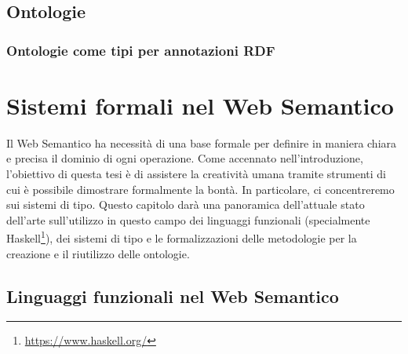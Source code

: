 \subsection{Ontologie}
\subsubsection[Ontologie come tipi per RDF]{Ontologie come tipi per annotazioni RDF}
\section{Sistemi formali nel Web Semantico}
Il Web Semantico ha necessità di una base formale per definire in maniera chiara e precisa il dominio di ogni operazione. Come accennato nell'introduzione, l'obiettivo di questa tesi è di assistere la creatività umana tramite strumenti di cui è possibile dimostrare formalmente la bontà. In particolare, ci concentreremo sui sistemi di tipo. Questo capitolo darà una panoramica dell'attuale stato dell'arte sull'utilizzo in questo campo dei linguaggi funzionali (specialmente Haskell\footnote{\url{https://www.haskell.org/}}), dei sistemi di tipo e le formalizzazioni delle metodologie per la creazione e il riutilizzo delle ontologie.

\subsection{Linguaggi funzionali nel Web Semantico}